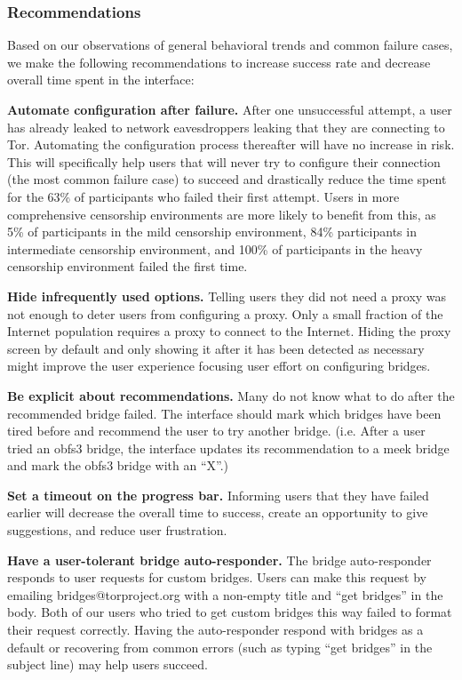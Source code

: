 \documentclass[USenglish,oneside,twocolumn]{article}
\begin{document}
\subsubsection{Recommendations}
\label{recommendations}
Based on our observations of general behavioral trends and common failure cases, we make the following recommendations to increase success rate and decrease overall time spent in the interface: \\

\begin{description}
\item {\bfseries Automate configuration after failure.} After one unsuccessful attempt, a user has already leaked to network eavesdroppers leaking that they are connecting to Tor. Automating the configuration process thereafter will have no increase in risk. This will specifically help users that will never try to configure their connection (the most common failure case) to succeed and drastically reduce the time spent for the 63\% of participants who failed their first attempt. Users in more comprehensive censorship environments are more likely to benefit from this, as 5\% of participants in the mild censorship environment, 84\% participants in intermediate censorship environment, and 100\% of participants in the heavy censorship environment failed the first time.
\item{\bfseries Hide infrequently used options.} Telling users they did not need a proxy was not enough to deter users from configuring a proxy. Only a small fraction of the Internet population requires a proxy to connect to the Internet. Hiding the proxy screen by default and only showing it after it has been detected as necessary might improve the user experience focusing user effort on configuring bridges.
\item {\bfseries Be explicit about recommendations.} Many do not know what to do after the recommended bridge failed. The interface should mark which bridges have been tired before and recommend the user to try another bridge. (i.e. After a user tried an obfs3 bridge, the interface updates its recommendation to a meek bridge and mark the obfs3 bridge with an ``X''.)
\item{\bfseries Set a timeout on the progress bar.} Informing users that they have failed earlier will decrease the overall time to success, create an opportunity to give suggestions, and reduce user frustration. 
\item{\bfseries Have a user-tolerant bridge auto-responder.} The bridge auto-responder responds to user requests for custom bridges. Users can make this request by emailing bridges@torproject.org with a non-empty title and ``get bridges'' in the body. Both of our users who tried to get custom bridges this way failed to format their request correctly. Having the auto-responder respond with bridges as a default or recovering from common errors (such as typing ``get bridges'' in the subject line) may help users succeed. 
\end{description} 
\end{document}
